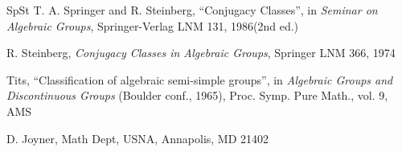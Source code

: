 \documentclass[12pt,letterpaper]{amsart}
\begin{document}
\begin{thebibliography}{SpSt}
 T. A. Springer and R. Steinberg, ``Conjugacy Classes'',
in \textit{Seminar on Algebraic Groups}, Springer-Verlag LNM 131, 1986(2nd ed.)

 R. Steinberg, \textit{Conjugacy Classes
in Algebraic Groups},
Springer LNM 366, 1974

 Tits, ``Classification of algebraic semi-simple groups'',
in \textit{Algebraic Groups and Discontinuous Groups}
(Boulder conf., 1965), Proc. Symp. Pure Math., vol. 9, AMS

\end{thebibliography}

\medskip
\noindent
D. Joyner, Math Dept, USNA, Annapolis, MD 21402
\end{document}
